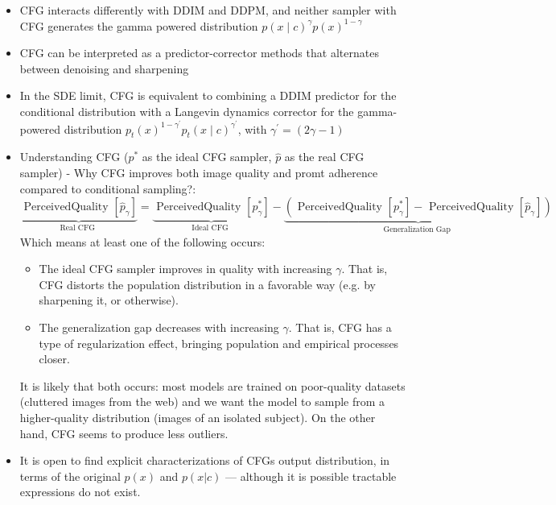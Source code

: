 \documentclass{article}
\begin{document}
\begin{itemize}
    \item CFG interacts differently with DDIM and DDPM, and neither sampler with CFG generates the gamma powered distribution $p(x \mid c)^\gamma p(x)^{1-\gamma}$
    \item CFG can be interpreted as a predictor-corrector methods that alternates between denoising and sharpening
    \item In the SDE limit, CFG is equivalent to combining a DDIM predictor for the conditional distribution with a Langevin dynamics corrector for the gamma-powered distribution $p_t(x)^{1-\gamma^{\prime}} p_t(x \mid c)^{\gamma^{\prime}}$, with $\gamma^{\prime}=(2 \gamma-1)$
    \item Understanding CFG ($p^*$ as the ideal CFG sampler, $\hat{p}$ as the real CFG sampler) - Why CFG improves both image quality and promt adherence compared to conditional sampling?: 
    $$
    \underbrace{\text { PerceivedQuality }\left[\widehat{p}_\gamma\right]}_{\text {Real CFG }}=\underbrace{\text { PerceivedQuality }\left[p_\gamma^*\right]}_{\text {Ideal CFG }}-\underbrace{\left(\text { PerceivedQuality }\left[p_\gamma^*\right]-\text { PerceivedQuality }\left[\widehat{p}_\gamma\right]\right)}_{\text {Generalization Gap }}
    $$
    Which means at least one of the following occurs:
    \begin{itemize}
        \item The ideal CFG sampler improves in quality with increasing $\gamma$. That is, CFG distorts the population distribution in a favorable way (e.g. by sharpening it, or otherwise).
        \item The generalization gap decreases with increasing $\gamma$. That is, CFG has a type of regularization effect, bringing population and empirical processes closer.
    \end{itemize}
    It is likely that both occurs: most models are trained on poor-quality datasets (cluttered images from the web) and we want the model to sample from a higher-quality distribution (images of an isolated subject).
    On the other hand, CFG seems to produce less outliers.
    \item It is open to find explicit characterizations of CFGs output distribution, in terms of the original $p(x)$ and $p(x|c)$ — although it is possible tractable expressions do not exist.

\end{itemize}
\end{document}
